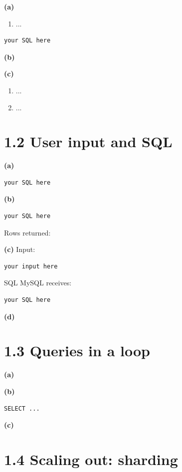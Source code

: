 \textbf{(a)}
\begin{enumerate}
  \item ...
\end{enumerate}

\begin{lstlisting}
your SQL here
\end{lstlisting}

\textbf{(b)}

\textbf{(c)}
\begin{enumerate}
  \item ...
  \item ...
\end{enumerate}

\section*{1.2 User input and SQL}

\textbf{(a)}
\begin{lstlisting}
your SQL here
\end{lstlisting}

\textbf{(b)}
\begin{lstlisting}
your SQL here
\end{lstlisting}
Rows returned:

\textbf{(c)} Input:
\begin{lstlisting}
your input here
\end{lstlisting}
SQL MySQL receives:
\begin{lstlisting}
your SQL here
\end{lstlisting}

\textbf{(d)}

\section*{1.3 Queries in a loop}

\textbf{(a)}

\textbf{(b)}
\begin{lstlisting}
SELECT ...
\end{lstlisting}

\textbf{(c)}

\section*{1.4 Scaling out: sharding}

